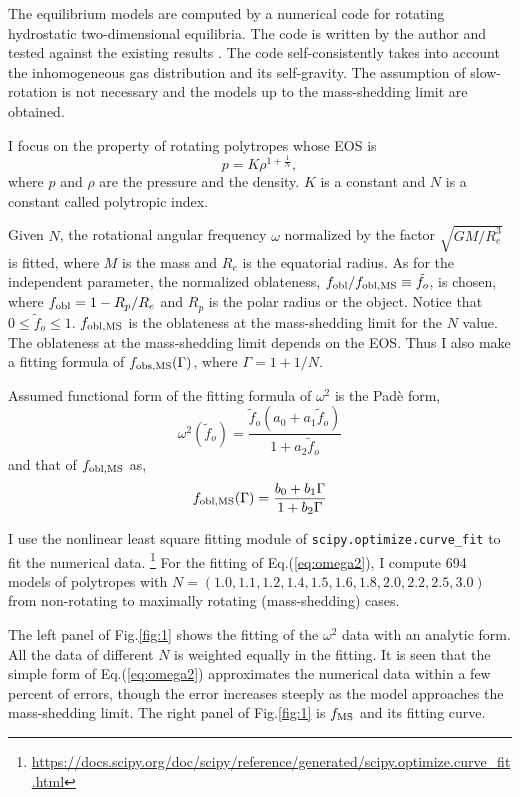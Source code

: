 \documentclass[RNAAS, a4paper, dvipdfmx]{aastex631} %
\begin{document}
The equilibrium models are computed by a numerical code for 
rotating hydrostatic two-dimensional equilibria.
The code is written by the author and tested against the existing
results \citep{HSCF}. The code self-consistently takes into account
the inhomogeneous gas distribution and its self-gravity. The assumption
of slow-rotation is not necessary and the models up to the mass-shedding
limit are obtained.

I focus on the property of rotating polytropes whose EOS is
\begin{equation}
	p = K \rho^{1+\frac{1}{N}},
\end{equation}
where $p$ and $\rho$ are the pressure and the density. $K$ is a constant
and $N$ is a constant called polytropic index. 

Given $N$, the rotational angular frequency $\omega$ normalized by the factor $\sqrt{GM/R_e^3}$
is fitted, where $M$ is the mass and $R_e$ is the equatorial radius. As for the independent
parameter, the normalized oblateness, $f_{\rm obl}/f_{\rm obl, MS}\equiv\tilde{f}_o$, is chosen,
where $f_{\rm obl} = 1-R_p/R_e$ and $R_p$ is the polar radius or the object.
Notice that $0\le \tilde{f}_o \le 1$.
$f_{\rm obl, MS}$ is the oblateness at the mass-shedding limit for the $N$ value.
The oblateness at the mass-shedding limit depends on the EOS. Thus I also
make a fitting formula of $f_{\rm obs, MS} (\Gamma)$, where $\Gamma = 1+1/N$.

Assumed functional form of the fitting formula of $\omega^2$ is the Pad\`{e} form,
\begin{equation}
	\omega^2(\tilde{f}_o) = \frac{\tilde{f}_o (a_0 + a_1 \tilde{f}_o)}{1 + a_2 \tilde{f}_o}
	\label{eq:omega2}
\end{equation}
and that of $f_{\rm obl, MS}$ as,
\begin{equation}
	f_{\rm obl, MS}(\Gamma) = \frac{b_0 + b_1 \Gamma}{1 + b_2 \Gamma}
	\label{eq:foblMS}
\end{equation}

I use the nonlinear least square fitting module of {\tt scipy.optimize.curve\_fit}
to fit the numerical data.
\footnote{\url{https://docs.scipy.org/doc/scipy/reference/generated/scipy.optimize.curve_fit.html}
}
For the fitting of Eq.(\ref{eq:omega2}), I compute 694
models of polytropes with $N=(1.0, 1.1, 1.2, 1.4, 1.5, 1.6, 1.8, 2.0, 2.2, 2.5, 3.0)$
from non-rotating to maximally rotating (mass-shedding) cases.

The left panel of Fig.\ref{fig:1} shows the fitting of the $\omega^2$ data with an analytic 
form. All the data of different $N$ is weighted equally in the fitting. It is seen that the
simple form of Eq.(\ref{eq:omega2}) approximates the numerical data
within a few percent of errors, though the error increases steeply
as the model approaches the mass-shedding limit.
The right panel of Fig.\ref{fig:1} is $f_{\rm MS}$ and its fitting curve.
\end{document}
